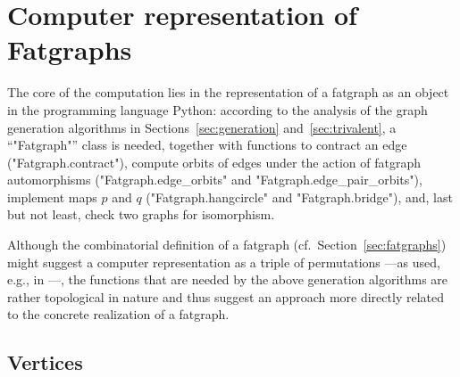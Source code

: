 \section{Computer representation of Fatgraphs}
\label{sec:fatgraph-representation}

The core of the computation lies in the representation of a fatgraph
as an object in the programming language Python: according to the
analysis of the graph generation algorithms in
Sections~\ref{sec:generation} and~\ref{sec:trivalent}, a
``"Fatgraph"'' class is needed, together with functions to contract an
edge ("Fatgraph.contract"), compute orbits of edges under the action
of fatgraph automorphisms ("Fatgraph.edge_orbits" and
"Fatgraph.edge_pair_orbits"), implement maps $p$ and $q$
("Fatgraph.hangcircle" and "Fatgraph.bridge"), and, last but not
least, check two graphs for isomorphism.

Although the combinatorial definition of a fatgraph
(cf.~Section~\ref{sec:fatgraphs}) might suggest a computer representation as
a triple of permutations ---as used, e.g., in \cite[Section
2.4]{arXiv:0902.1025}---, the functions that are needed by the above
generation algorithms are rather topological in nature and thus
suggest an approach more directly related to the concrete realization
of a fatgraph.

\subsection{Vertices}
\label{sec:vertices}

